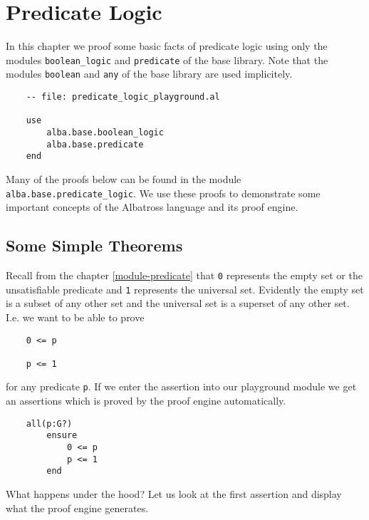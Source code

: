 \section{Predicate Logic}

In this chapter we proof some basic facts of predicate logic using only the
modules \lstinline!boolean_logic! and \lstinline!predicate! of the base
library. Note that the modules \lstinline!boolean! and \lstinline!any! of the
base library are used implicitely.

\begin{lstlisting}
    -- file: predicate_logic_playground.al

    use
        alba.base.boolean_logic
        alba.base.predicate
    end
\end{lstlisting}

Many of the proofs below can be found in the module
\lstinline!alba.base.predicate_logic!. We use these proofs to demonstrate some
important concepts of the Albatross language and its proof engine.



\subsection{Some Simple Theorems}

Recall from the chapter \ref{module-predicate} that \lstinline!0! represents
the empty set or the unsatisfiable predicate and \lstinline!1! represents the
universal set. Evidently the empty set is a subset of any other set and the
universal set is a superset of any other set. I.e. we want to be able to prove

\begin{lstlisting}
    0 <= p

    p <= 1
\end{lstlisting}
for any predicate \lstinline!p!. If we enter the assertion into our playground
module we get an assertions which is proved by the proof engine automatically.

\begin{lstlisting}
    all(p:G?)
        ensure
            0 <= p
            p <= 1
        end
\end{lstlisting}

What happens under the hood? Let us look at the first assertion and display
what the proof engine generates.

